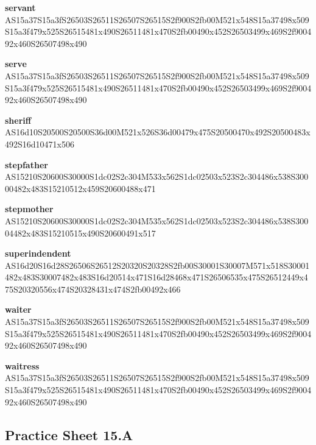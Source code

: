 \documentclass{article}
\begin{document}
\begin{glossary}
\textbf{servant}\\
AS15a37S15a3fS26503S26511S26507S26515S2f900S2fb00M521x548S15a37498x509S15a3f479x525S26515481x490S26511481x470S2fb00490x452S26503499x469S2f900492x460S26507498x490

\textbf{serve}\\
AS15a37S15a3fS26503S26511S26507S26515S2f900S2fb00M521x548S15a37498x509S15a3f479x525S26515481x490S26511481x470S2fb00490x452S26503499x469S2f900492x460S26507498x490

\textbf{sheriff}\\
AS16d10S20500S20500S36d00M521x526S36d00479x475S20500470x492S20500483x492S16d10471x506

\textbf{stepfather}\\
AS15210S20600S30000S1dc02S2c304M533x562S1dc02503x523S2c304486x538S30000482x483S15210512x459S20600488x471

\textbf{stepmother}\\
AS15210S20600S30000S1dc02S2c304M535x562S1dc02503x523S2c304486x538S30004482x483S15210515x490S20600491x517

\textbf{superindendent}\\
AS16d20S16d28S26506S26512S20320S20328S2fb00S30001S30007M571x518S30001482x483S30007482x483S16d20514x471S16d28468x471S26506535x475S26512449x475S20320556x474S20328431x474S2fb00492x466

\textbf{waiter}\\
AS15a37S15a3fS26503S26511S26507S26515S2f900S2fb00M521x548S15a37498x509S15a3f479x525S26515481x490S26511481x470S2fb00490x452S26503499x469S2f900492x460S26507498x490

\textbf{waitress}\\
AS15a37S15a3fS26503S26511S26507S26515S2f900S2fb00M521x548S15a37498x509S15a3f479x525S26515481x490S26511481x470S2fb00490x452S26503499x469S2f900492x460S26507498x490

\end{glossary}

\subsection{Practice Sheet 15.A}
\end{document}
